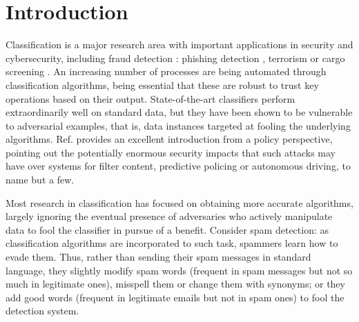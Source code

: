 
\section{Introduction}



Classification is a major research area with important applications  in security and cybersecurity, including fraud detection \parencite{bolton2002statistical}: phishing detection \parencite{rakesh}, terrorism \parencite{terror} or cargo screening \parencite{cargo}. An increasing number of processes are being automated through classification algorithms, being essential that these are robust to trust key operations based on their output. State-of-the-art classifiers perform extraordinarily well on standard data, but they have been shown to be vulnerable to adversarial examples, that is, data instances targeted at fooling the underlying algorithms. Ref. \parencite{comiter} provides an excellent introduction from a policy perspective, pointing out the potentially enormous security impacts that such attacks may have over systems for filter content, predictive policing or autonomous driving, to name but a few. 

Most research in classification has focused on obtaining more accurate algorithms, largely ignoring the eventual presence of adversaries who actively manipulate data to fool the classifier in pursue of a benefit. Consider 
spam detection: as classification algorithms are incorporated to such task,
spammers learn how to evade them. Thus, rather than sending their spam messages in standard language, they 
 slightly modify spam words (frequent in spam messages but not 
so much in legitimate ones), misspell them or 
change them with synonyms; or they add good words (frequent in legitimate emails but not in spam ones) to fool the detection system. %

